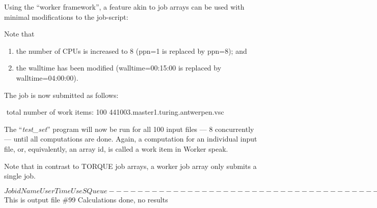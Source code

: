 
Using the ``worker framework'', a feature akin to job arrays can be used with minimal modifications to the job-script:

Note that

\begin{enumerate}
\item  the number of CPUs is increased to 8 (ppn=1 is replaced by ppn=8); and
\item  the walltime has been modified (walltime=00:15:00 is replaced by walltime=04:00:00).
\end{enumerate}

The job is now submitted as follows:
\begin{prompt}
$ %
$ %
total number of work items: 100
441003.master1.turing.antwerpen.vsc
\end{prompt}

The ``\textit{test\_set}'' program will now be run for all 100 input files --- 8 concurrently --- until all computations are done. Again, a computation for an individual input file, or, equivalently, an array id, is called a work item in Worker speak.

Note that in contrast to TORQUE job arrays, a worker job array only submits a single job.
\begin{prompt}
$ %
Job id                    Name             User            Time                  Use S Queue
------------------------- ---------------- --------------- -------- ----- - ---------------
441003.master1             test\_set.pbs     vsc20167               0 Q qreg

And you can now check the generated output files:
$ %
This is output file \#99
Calculations done, no results
\end{prompt}

